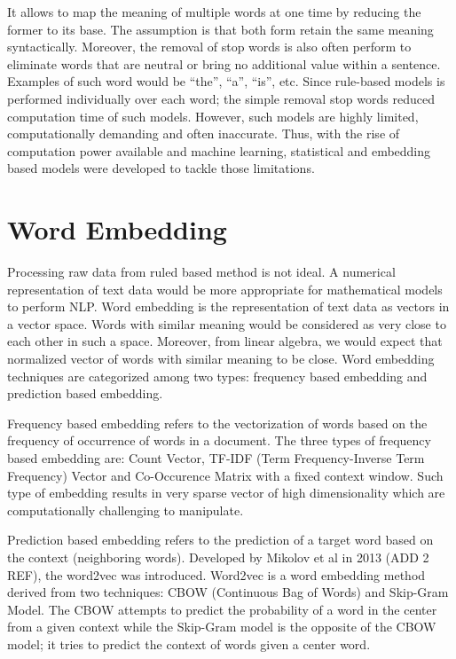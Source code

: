 It allows to map the meaning of multiple words at one time by reducing the former to its base. The assumption is that both form retain the same meaning syntactically. Moreover, the removal of stop words is also often perform to eliminate words that are neutral or bring no additional value within a sentence. Examples of such word would be “the”, “a”, “is”, etc. Since rule-based models is performed individually over each word; the simple removal stop words reduced computation time of such models. However, such models are highly limited, computationally demanding and often inaccurate. Thus, with the rise of computation power available and machine learning, statistical and embedding based models were developed to tackle those limitations.
\section{Word Embedding}
Processing raw data from ruled based method is not ideal. A numerical representation of text data would be more appropriate for mathematical models to perform NLP. Word embedding is the representation of text data as vectors in a vector space. Words with similar meaning would be considered as very close to each other in such a space. Moreover, from linear algebra, we would expect that normalized vector of words with similar meaning to be close. Word embedding techniques are categorized among two types: frequency based embedding and prediction based embedding. 

Frequency based embedding refers to the vectorization of words based on the frequency of occurrence of words in a document. The three types of frequency based embedding are: Count Vector, TF-IDF (Term Frequency-Inverse Term Frequency) Vector and Co-Occurence Matrix with a fixed context window. Such type of embedding results in very sparse vector of high dimensionality which are computationally challenging to manipulate. 

Prediction based embedding refers to the prediction of a target word based on the context (neighboring words). Developed by Mikolov et al  in 2013 (ADD 2 REF), the word2vec was introduced. Word2vec is a word embedding method derived from two techniques: CBOW (Continuous Bag of Words) and Skip-Gram Model. The CBOW attempts to predict the probability of a word in the center from a given context while the Skip-Gram model is the opposite of the CBOW model; it tries to predict the context of words given a center word.
